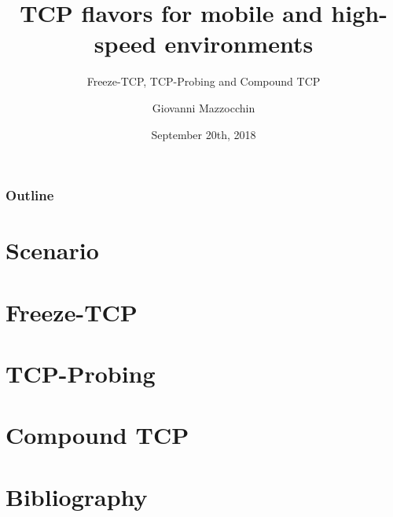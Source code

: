 \documentclass{beamer}
\title{TCP flavors for mobile and high-speed environments}
\subtitle{\newline Freeze-TCP, TCP-Probing and Compound TCP}
\author{Giovanni Mazzocchin}
\date{September 20th, 2018}
\institute{Università degli Studi di Padova}
\begin{document}
\newcommand{\turnOffNumbers}{true} %

\begin{frame}[noframenumbering]
\titlepage
\end{frame}

\let\turnOffNumbers\empty
\begin{frame}
	\frametitle{Outline}
	\tableofcontents
\end{frame}

\section{Scenario}



\section{Freeze-TCP}









\section{TCP-Probing}









\section{Compound TCP}













%
%

\appendix
\section{Bibliography}

\makethanks
\end{document}
